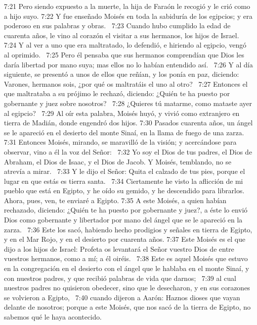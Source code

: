 7:21 Pero siendo expuesto a la muerte, la hija de Faraón le recogió y le crió como a hijo suyo. 
7:22 Y fue enseñado Moisés en toda la sabiduría de los egipcios; y era poderoso en sus palabras y obras.  
7:23 Cuando hubo cumplido la edad de cuarenta años, le vino al corazón el visitar a sus hermanos, los hijos de Israel.  
7:24 Y al ver a uno que era maltratado, lo defendió, e hiriendo al egipcio, vengó al oprimido.  
7:25 Pero él pensaba que sus hermanos comprendían que Dios les daría libertad por mano suya; mas ellos no lo habían entendido así.  
7:26 Y al día siguiente, se presentó a unos de ellos que reñían, y los ponía en paz, diciendo: Varones, hermanos sois, ¿por qué os maltratáis el uno al otro?  
7:27 Entonces el que maltrataba a su prójimo le rechazó, diciendo: ¿Quién te ha puesto por gobernante y juez sobre nosotros?  
7:28 ¿Quieres tú matarme, como mataste ayer al egipcio?  
7:29 Al oír esta palabra, Moisés huyó, y vivió como extranjero en tierra de Madián, donde engendró dos hijos. 
7:30 Pasados cuarenta años, un ángel se le apareció en el desierto del monte Sinaí, en la llama de fuego de una zarza.  
7:31 Entonces Moisés, mirando, se maravilló de la visión; y acercándose para observar, vino a él la voz del Señor:  
7:32 Yo soy el Dios de tus padres, el Dios de Abraham, el Dios de Isaac, y el Dios de Jacob. Y Moisés, temblando, no se atrevía a mirar.  
7:33 Y le dijo el Señor: Quita el calzado de tus pies, porque el lugar en que estás es tierra santa.  
7:34 Ciertamente he visto la aflicción de mi pueblo que está en Egipto, y he oído su gemido, y he descendido para librarlos. Ahora, pues, ven, te enviaré a Egipto. 
7:35 A este Moisés, a quien habían rechazado, diciendo: ¿Quién te ha puesto por gobernante y juez?, a éste lo envió Dios como gobernante y libertador por mano del ángel que se le apareció en la zarza.  
7:36 Este los sacó, habiendo hecho prodigios y señales en tierra de Egipto, y en el Mar Rojo, y en el desierto por cuarenta años. 
7:37 Este Moisés es el que dijo a los hijos de Israel: Profeta os levantará el Señor vuestro Dios de entre vuestros hermanos, como a mí; a él oiréis.  
7:38 Este es aquel Moisés que estuvo en la congregación en el desierto con el ángel que le hablaba en el monte Sinaí, y con nuestros padres, y que recibió palabras de vida que darnos;  
7:39 al cual nuestros padres no quisieron obedecer, sino que le desecharon, y en sus corazones se volvieron a Egipto,  
7:40 cuando dijeron a Aarón: Haznos dioses que vayan delante de nosotros; porque a este Moisés, que nos sacó de la tierra de Egipto, no sabemos qué le haya acontecido. 
